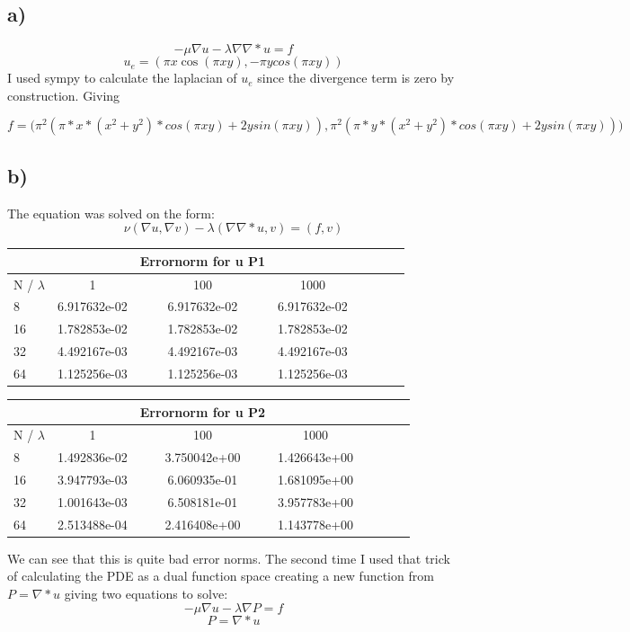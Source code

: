 \documentclass[a4paper,norsk]{article}
\begin{document}
\subsection*{a)}
$$-\mu \nabla u -  \lambda \nabla \nabla * u  = f $$
$$ u_e = (\pi x \cos(\pi x y),-\pi y cos(\pi x y)) $$
I used sympy to calculate the laplacian  of $u_e$ since the divergence term is zero by construction. Giving

$$ f = \big(\pi^2(\pi*x*(x^2+y^2)*cos(\pi x y) + 2 y sin(\pi x y))  ,  \pi^2(\pi*y*(x^2+y^2)*cos(\pi x y) + 2 y sin(\pi x y))       \big) $$




\subsection*{b)}
The equation was solved on the form:
$$   \nu(\nabla u, \nabla v) - \lambda (\nabla \nabla *u,v) = (f,v)    $$

\begin{tabular}{l*{6}{c}r}
 & & Errornorm for u  P1 &  \\
\hline
N / $\lambda$      &1 & 100 & 1000  \\
\hline
8   &   6.917632e-02  & 6.917632e-02 & 6.917632e-02 \\
16 &   1.782853e-02  & 1.782853e-02 & 1.782853e-02 \\
32 &   4.492167e-03  & 4.492167e-03 & 4.492167e-03 \\
64 &   1.125256e-03  & 1.125256e-03 & 1.125256e-03\\
\end{tabular}

\begin{tabular}{l*{6}{c}r}
 & & Errornorm for u  P2 &  \\
\hline
N / $\lambda$      &1 & 100 & 1000  \\
\hline
8   & 1.492836e-02 & 3.750042e+00 & 1.426643e+00 \\
16 & 3.947793e-03 & 6.060935e-01 &  1.681095e+00\\
32 & 1.001643e-03 & 6.508181e-01 &  3.957783e+00 \\
64 & 2.513488e-04 & 2.416408e+00 & 1.143778e+00 \\
\end{tabular}
\newline
We can see that this is quite bad error norms. The second time I used that trick of calculating the PDE as a dual function space creating a new function from $ P = \nabla * u $ giving two equations to solve:
$$ -\mu \nabla u - \lambda \nabla P = f $$
$$  P = \nabla * u  $$
\end{document}
